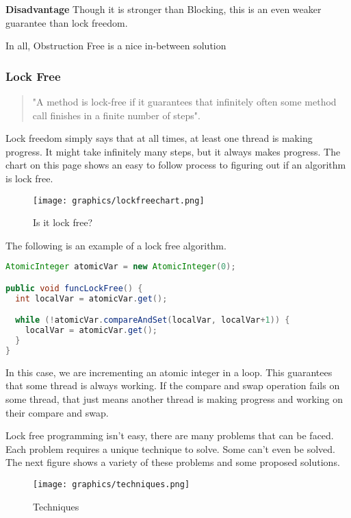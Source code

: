 \documentclass[letterpaper, 12pt]{article}
\begin{document}
{\bfseries Disadvantage}\newline
Though it is stronger than Blocking, this is an even weaker guarantee than lock freedom.

\par\vspace{\baselineskip}
In all, Obstruction Free is a nice in-between solution

\subsubsection{Lock Free}
\begin{quotation}
	"A method is lock-free if it guarantees that infinitely often some method call finishes 
	in a finite number of steps"\citep[p. 60]{artofmulti}.
\end{quotation}

Lock freedom simply says that at all times, at least one thread is making progress. It might 
take infinitely many steps, but it always makes progress. The chart on this page shows 
an easy to follow process to figuring out if an algorithm is lock free. 

\begin{figure}
    \centering
	\texttt{[image: graphics/lockfreechart.png]}
    \caption{Is it lock free?}
    \citep{introlockfree}
\end{figure}

The following is an example of a lock free algorithm.
\citep{concurrencyfreaks}
\begin{lstlisting}[language=Java]
AtomicInteger atomicVar = new AtomicInteger(0);

public void funcLockFree() {
  int localVar = atomicVar.get();

  while (!atomicVar.compareAndSet(localVar, localVar+1)) {
    localVar = atomicVar.get();
  }
}
\end{lstlisting} 
In this case, we are incrementing an atomic integer in a loop. This guarantees that 
some thread is always working. If the compare and swap operation fails on some thread, 
that just means another thread is making progress and working on their compare and swap.

Lock free programming isn't easy, there are many problems that can be faced. Each 
problem requires a unique technique to solve. Some can't even be solved. The next 
figure shows a variety of these problems and some proposed solutions.

\begin{figure}
    \centering
	\texttt{[image: graphics/techniques.png]}
	\caption{Techniques}
	\citep{introlockfree}
\end{figure}
\end{document}

